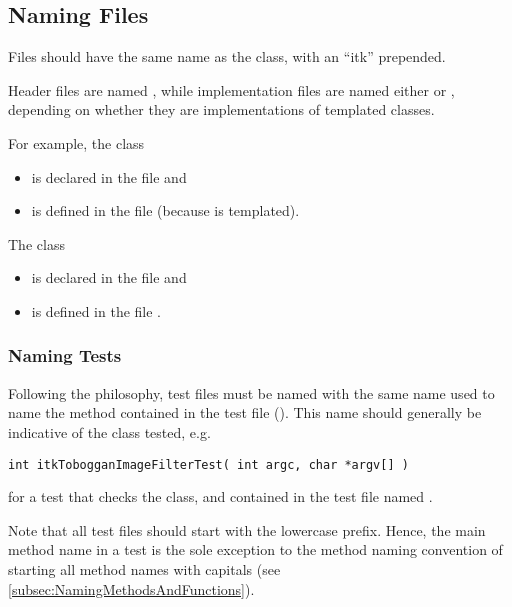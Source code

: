 \subsection{Naming Files}
\label{subsec:NamingFiles}

Files should have the same name as the class, with an ``itk'' prepended.

Header files are named , while implementation files are named either
 or , depending on whether they are implementations of
templated classes.

For example, the class 
\begin{itemize}
\item is declared in the file  and
\item is defined in the file  (because 
is templated).
\end{itemize}

The class 
\begin{itemize}
\item is declared in the file  and
\item is defined in the file .
\end{itemize}


\subsubsection{Naming Tests}
\label{subsubsec:NamingTests}

Following the  philosophy, test files must be named with
the same name used to name the  method contained in the test file
(). This name should generally be indicative of the class tested,
e.g.
\small
\begin{verbatim}
int itkTobogganImageFilterTest( int argc, char *argv[] )
\end{verbatim}
\normalsize

for a test that checks the  class, and contained
in the test file named .

Note that all test files should start with the lowercase  prefix.
Hence, the main method name in a test is the sole exception to the method naming
convention of starting all method names with capitals (see
\ref{subsec:NamingMethodsAndFunctions}).

